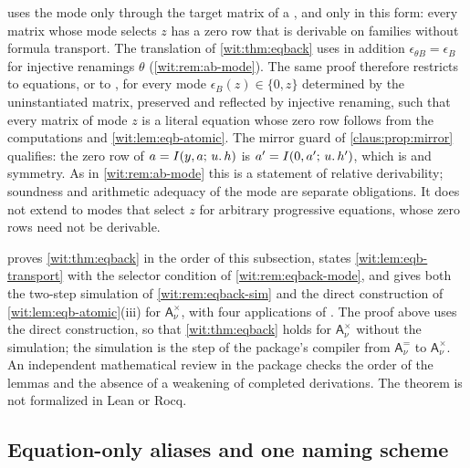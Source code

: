 \begin{remark}
\label{wit:rem:eqback-mode}
 uses the mode only through the target matrix of
a , and only in this form: every matrix whose mode selects
$z$ has a zero row that is derivable on families without formula transport.
The translation of \cref{wit:thm:eqback} uses in addition
$\epsilon_{\theta B}=\epsilon_B$ for injective renamings $\theta$
(\cref{wit:rem:ab-mode}).  The same proof therefore restricts
 to equations, or to , for every mode
$\epsilon_B(z)\in\{0,z\}$ determined by the uninstantiated matrix, preserved
and reflected by injective renaming, such that every matrix of mode $z$ is a
literal equation whose zero row follows from the computations and
\cref{wit:lem:eqb-atomic}.  The mirror guard of \cref{claus:prop:mirror}
qualifies: the zero row of $a=I(y,a;\,u.\,h)$ is $a'=I(0,a';\,u.\,h')$,
which is  and symmetry.  As in \cref{wit:rem:ab-mode} this is a
statement of relative derivability; soundness and arithmetic adequacy of the
mode are separate obligations.  It does not extend to modes that select $z$
for arbitrary progressive equations, whose zero rows need not be derivable.
\end{remark}

\begin{remark}
\label{wit:rem:eqback-package}
 proves \cref{wit:thm:eqback} in the order of
this subsection, states \cref{wit:lem:eqb-transport} with the selector
condition of \cref{wit:rem:eqback-mode}, and gives both the two-step
simulation of \cref{wit:rem:eqback-sim} and the direct construction of
\cref{wit:lem:eqb-atomic}(iii) for $\mathsf{A}^{\times}_{\nu}$, with four
applications of .  The proof above uses the direct
construction, so that \cref{wit:thm:eqback} holds for
$\mathsf{A}^{\times}_{\nu}$ without the simulation; the simulation is the
step of the package's compiler from $\mathsf{A}^{=}_{\nu}$ to
$\mathsf{A}^{\times}_{\nu}$.  An independent mathematical review in
the package checks the order of the lemmas and the absence of a weakening of
completed derivations.  The theorem is not formalized in Lean or Rocq.
\end{remark}

\subsection{Equation-only aliases and one naming scheme}
\label{wit:sec:ns}

